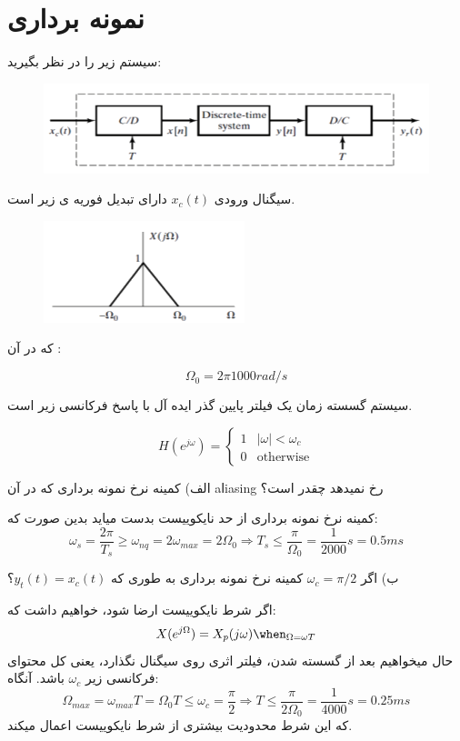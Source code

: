 \section{نمونه برداری}

سیستم زیر را در نظر بگیرید:

\begin{figure}[h]
	\centering
	\includegraphics*[width=0.6\linewidth]{pics/q2_1.png}
\end{figure}

سیگنال ورودی $x_c(t)$ دارای تبدیل فوریە ی زیر است.

\begin{figure}[h]
	\centering
	\includegraphics*[width=0.3\linewidth]{pics/q2_2.png}
\end{figure}

که در آن :

\[
	\Omega_0=2\pi 1000rad/s
\]

سیستم گسسته زمان یک فیلتر پایین گذر ایده آل با پاسخ فرکانسی زیر است.

\[
	H(e^{j\omega})=\begin{cases}
		1 & |\omega|<\omega_c \\
		0 & \text{otherwise}
	\end{cases}
\]

الف) کمینه نرخ نمونه برداری که در آن aⅼiasing رخ نمیدهد چقدر است؟

\begin{qsolve}[]
    کمینه نرخ نمونه برداری از حد نایکوییست بدست میاید بدین صورت که:
    \[
        \omega_s=\frac{2\pi}{T_s}\geq\omega_{nq}=2\omega_{max}=2\Omega_0\Rightarrow
        T_s\leq\frac{\pi}{\Omega_0}=\frac{1}{2000}s=0.5ms
    \]
\end{qsolve}

ب) اگر $\omega_c=\pi/2$ کمینه نرخ نمونه برداری به طوری که $y_t(t)=x_c(t)$؟


\begin{qsolve}[]
    اگر شرط نایکوییست ارضا شود، خواهیم داشت که:
    \[
        X(e^{j\Omega})=X_p(j\omega)\when_{\Omega=\omega T}    
    \]
    حال میخواهیم بعد از گسسته شدن، فیلتر اثری روی سیگنال نگذارد، یعنی کل محتوای فرکانسی زیر 
    $\omega_c$ باشد. آنگاه:
    \[
      \Omega_{max}=\omega_{max}T=\Omega_0T\leq\omega_c=\frac{\pi}{2}\Rightarrow T\leq\frac{\pi}{2\Omega_0}
      =\frac{1}{4000}s=0.25ms  
    \]
    که این شرط محدودیت بیشتری از شرط نایکوییست اعمال میکند.
\end{qsolve}
